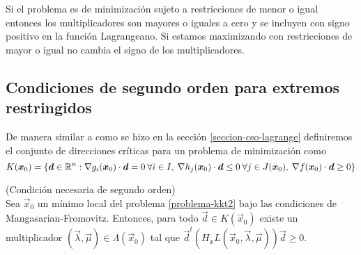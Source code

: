 Si el problema es de minimizaci\'on sujeto a restricciones de menor o igual entonces los multiplicadores son mayores o iguales a cero y se incluyen con signo positivo en la funci\'on Lagrangeano. Si estamos maximizando con restricciones de mayor o igual no cambia el signo de los multiplicadores.

\subsection{Condiciones de segundo orden para extremos restringidos}

\begin{definicion}
De manera similar a como se hizo en la secci\'on \ref{seccion-cso-lagrange} definiremos el conjunto de direcciones cr\'iticas para un problema de minimizaci\'on como
$$K(\boldsymbol{x}_0)=\{\boldsymbol{d}\in \mathbb{R}^n : \nabla g_i(\boldsymbol{x}_0)\cdot \boldsymbol{d} = 0 \: \forall i\in I,\:\nabla h_j(\boldsymbol{x}_0)\cdot \boldsymbol{d} \leq 0 \: \forall j\in J(\boldsymbol{x}_0) ,\:\nabla f(\boldsymbol{x}_0)\cdot \boldsymbol{d} \geq 0\}$$
\end{definicion}

\begin{teorema}{\rm (Condici\'on necesaria de segundo orden)}\label{cnso-kkt}
\\Sea $\vec{x}_0$ un m\'inimo local del problema \ref{problema-kkt2} bajo las condiciones de Mangasarian-Fromovitz. Entonces, para todo $\vec{d} \in K(\vec{x}_0)$ existe un multiplicador $(\vec{\lambda},\vec{\mu})\in \Lambda(\vec{x}_0)$ tal que
$\vec{d}^t (H_x L(\vec{x}_0,\vec{\lambda},\vec{\mu})) \vec{d} \geq 0$.
\end{teorema}

